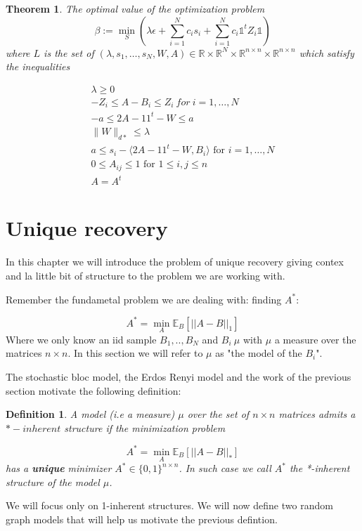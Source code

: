\documentclass[12pt]{amsart}
\newtheorem{definition}{Definition}
\newtheorem{theorem}[lemma]{Theorem}
\numberwithin{equation}{section}
\newcommand{\RR}{\mathbb{R}}
\newcommand{\EE}{\mathbb{E}}
\begin{document}
\begin{theorem} 
The optimal value of the optimization problem
\[\beta:=\min_S \left(\lambda\epsilon +\sum_{i=1}^N c_is_i+\sum_{i=1}^Nc_i\mathds{1}^tZ_i\mathds{1}\right)\]
where $L$ is the set of $(\lambda, s_1,\dots, s_N, W,A)\in \RR\times\RR^N\times \RR^{n\times n}\times \RR^{n\times n}$ which satisfy the inequalities
\begin{center}
\[
\begin{array}{l}
\lambda \geq 0\\
-Z_i \leq A-B_i \leq Z_i \ for \ i=1,\dots, N \\
-a \leq 2A-11^t-W \leq a \\
\|W\|_{d*}\leq \lambda\\
a\leq s_i-\langle 2A-11^t-W, B_i\rangle\text{ for $i=1,\dots, N$}\\
0\leq A_{ij}\leq 1 \text{ for  $1\leq i,j\leq n$} \\
A = A^t
\end{array}
\]

\end{center}


\end{theorem}

\section{Unique recovery}


In this chapter we will introduce the problem of unique recovery giving contex and la little bit of structure to the problem we are working with.



Remember the fundametal problem we are dealing with: finding $A^*$: 

\[
A^*=\min_A \EE_B\left[||A-B||_1\right]
\]
Where we only know an iid sample  $B_1,..,B_N$ and $B_i ~ \mu$ with $\mu$ a measure over the matrices $n \times n$. In this section we will refer to $\mu$ as "the model of the $B_i$".

The stochastic bloc model, the Erdos Renyi model and the work of the previous section motivate the following definition:


\begin{definition}
A model (i.e a measure) $\mu$ over the set of $n \times n$ matrices  admits a $*-inherent$ structure if the minimization problem 

\[
A^*=\min_A \EE_B\left[||A-B||_*\right]
\]
has a \textbf{unique} minimizer $A^* \in \{0,1\}^{n\times n}$. In such case we call $A^*$ the *-inherent structure of the model $\mu$.

\end{definition}
We will focus only on 1-inherent structures. We will now define two random graph models that will help us motivate the previous defintion.
\end{document}
